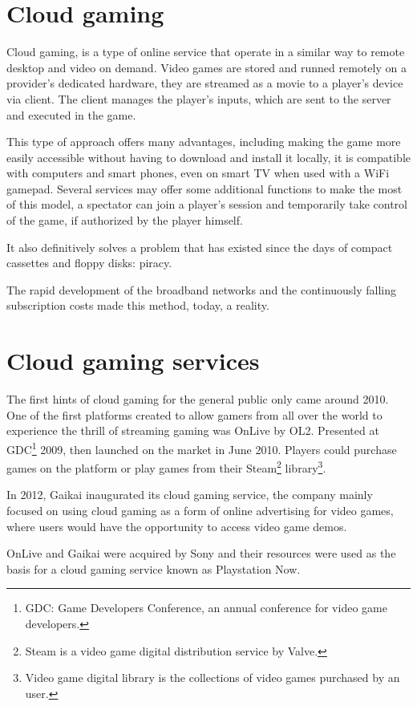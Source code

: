 \section{Cloud gaming}
Cloud gaming, is a type of online service that operate in a similar way to remote desktop and video on demand. Video games are stored and runned remotely on a provider's dedicated hardware, they are streamed as a movie to a player's device via client. The client manages the player's inputs, which are sent to the server and executed in the game.

This type of approach offers many advantages, including making the game more easily accessible without having to download and install it locally, it is compatible with computers and smart phones, even on smart TV when used with a WiFi gamepad. Several services may offer some additional functions to make the most of this model, a spectator can join a player's session and temporarily take control of the game, if authorized by the player himself.

It also definitively solves a problem that has existed since the days of compact cassettes and floppy disks: piracy.

The rapid development of the broadband networks and the continuously falling subscription costs made this method, today, a reality.

\section{Cloud gaming services}
The first hints of cloud gaming for the general public only came around 2010. One of the first platforms created to allow gamers from all over the world to experience the thrill of streaming gaming was OnLive by OL2. Presented at GDC\footnote{GDC: Game Developers Conference, an annual conference for video game developers.} 2009, then launched on the market in June 2010. Players could purchase games on the platform or play games from their Steam\footnote{Steam is a video game digital distribution service by Valve.} library\footnote{Video game digital library is the collections of video games purchased by an user.}.

In 2012, Gaikai inaugurated its cloud gaming service, the company mainly focused on using cloud gaming as a form of online advertising for video games, where users would have the opportunity to access video game demos.

OnLive and Gaikai were acquired by Sony and their resources were used as the basis for a cloud gaming service known as Playstation Now.

